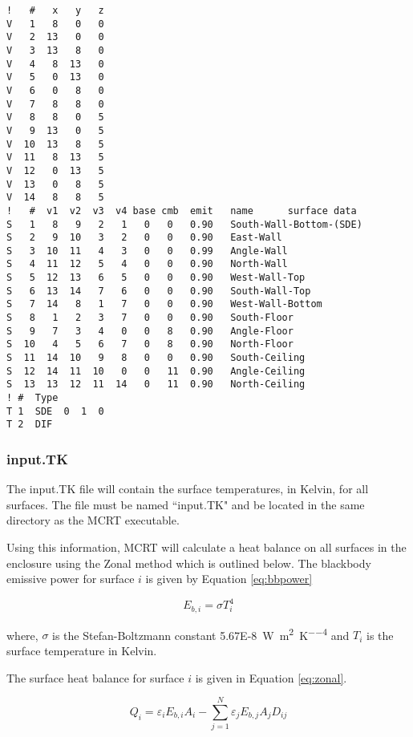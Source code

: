 \documentclass{article}
\begin{document}
\begin{lstlisting}
!   #   x   y   z
V   1   8   0   0
V   2  13   0   0
V   3  13   8   0
V   4   8  13   0
V   5   0  13   0
V   6   0   8   0
V   7   8   8   0
V   8   8   0   5
V   9  13   0   5
V  10  13   8   5
V  11   8  13   5
V  12   0  13   5
V  13   0   8   5
V  14   8   8   5
!   #  v1  v2  v3  v4 base cmb  emit   name      surface data
S   1   8   9   2   1   0   0   0.90   South-Wall-Bottom-(SDE)
S   2   9  10   3   2   0   0   0.90   East-Wall
S   3  10  11   4   3   0   0   0.99   Angle-Wall
S   4  11  12   5   4   0   0   0.90   North-Wall
S   5  12  13   6   5   0   0   0.90   West-Wall-Top
S   6  13  14   7   6   0   0   0.90   South-Wall-Top
S   7  14   8   1   7   0   0   0.90   West-Wall-Bottom
S   8   1   2   3   7   0   0   0.90   South-Floor
S   9   7   3   4   0   0   8   0.90   Angle-Floor
S  10   4   5   6   7   0   8   0.90   North-Floor
S  11  14  10   9   8   0   0   0.90   South-Ceiling
S  12  14  11  10   0   0   11  0.90   Angle-Ceiling
S  13  13  12  11  14   0   11  0.90   North-Ceiling
! #  Type
T 1  SDE  0  1  0
T 2  DIF
\end{lstlisting}

\subsubsection{input.TK}

The input.TK file will contain the surface temperatures, in Kelvin, for all surfaces. The file must be named ``input.TK" and be located in the same directory as the MCRT executable.

Using this information, MCRT will calculate a heat balance on all surfaces in the enclosure using the Zonal method which is outlined below. The blackbody emissive power for surface $i$ is given by Equation \ref{eq:bbpower}

\begin{equation}
    E_{b,i} = \sigma T_i^4
    \label{eq:bbpower}
\end{equation}

where, $\sigma$ is the Stefan-Boltzmann constant \SI{5.67E-8}{\watt\per\meter\squared\per\kelvin\tothe{4}} and $T_i$ is the surface temperature in Kelvin.

The surface heat balance for surface $i$ is given in Equation \ref{eq:zonal}.

\begin{equation}
    Q_i = \varepsilon_i E_{b,i} A_i - \sum_{j=1}^N \varepsilon_j E_{b,j} A_j D_{ij}
    \label{eq:zonal}
\end{equation}
\end{document}
